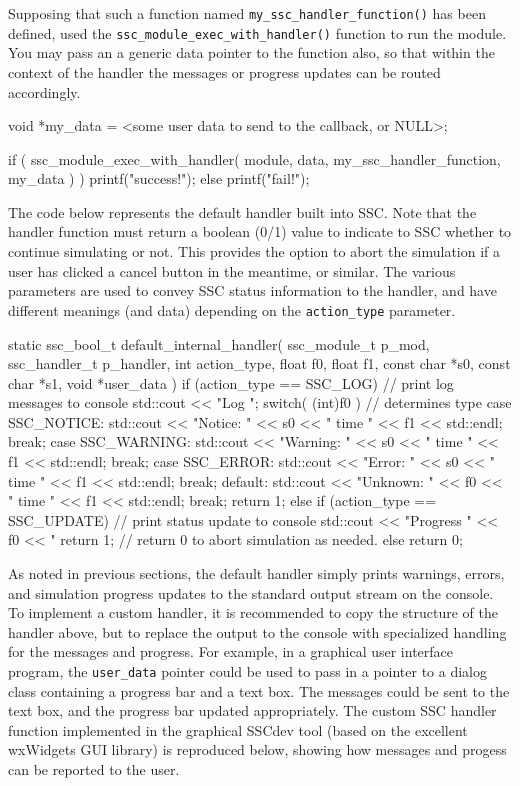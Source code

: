 \documentclass{article}
\begin{document}
Supposing that such a function named \texttt{my\_ssc\_handler\_function()} has been defined, used the \texttt{ssc\_module\_exec\_with\_handler()} function to run the module.  You may pass an a generic data pointer to the function also, so that within the context of the handler the messages or progress updates can be routed accordingly.

\begin{verbatimtab}[4]
void *my_data = <some user data to send to the callback, or NULL>;

if ( ssc_module_exec_with_handler( module, data, my_ssc_handler_function, my_data ) )
	printf("success!\n");
else
	printf("fail!\n");
\end{verbatimtab}

The code below represents the default handler built into SSC.  Note that the handler function must return a boolean (0/1) value to indicate to SSC whether to continue simulating or not.  This provides the option to abort the simulation if a user has clicked a cancel button in the meantime, or similar.  The various parameters are used to convey SSC status information to the handler, and have different meanings (and data) depending on the \texttt{action\_type} parameter.

\begin{verbatimtab}[4]
static ssc_bool_t default_internal_handler( ssc_module_t p_mod, ssc_handler_t p_handler,
	int action_type, float f0, float f1, 
	const char *s0, const char *s1,
	void *user_data )
{
	if (action_type == SSC_LOG)
	{
		// print log messages to console
		std::cout << "Log ";
		switch( (int)f0 ) // determines type
		{
		case SSC_NOTICE: 
			std::cout << "Notice: " << s0 << " time " << f1 << std::endl; 
			break;
		case SSC_WARNING: 
			std::cout << "Warning: " << s0 << " time " << f1 << std::endl; 
			break;
		case SSC_ERROR: 
			std::cout << "Error: " << s0 << " time " << f1 << std::endl; 
			break;
		default: 
			std::cout << "Unknown: " << f0 << " time " << f1 << std::endl; 
			break;
		}
		return 1;
	}
	else if (action_type == SSC_UPDATE)
	{
		// print status update to console
		std::cout << "Progress " << f0 << "%
		return 1; // return 0 to abort simulation as needed.
	}
	else
		return 0;
}
\end{verbatimtab}

As noted in previous sections, the default handler simply prints warnings, errors, and simulation progress updates to the standard output stream on the console.  To implement a custom handler, it is recommended to copy the structure of the handler above, but to replace the output to the console with specialized handling for the messages and progress.  For example, in a graphical user interface program, the \texttt{user\_data} pointer could be used to pass in a pointer to a dialog class containing a progress bar and a text box.  The messages could be sent to the text box, and the progress bar updated appropriately.  The custom SSC handler function implemented in the graphical SSCdev tool (based on the excellent wxWidgets GUI library) is reproduced below, showing how messages and progess can be reported to the user.
\end{document}
